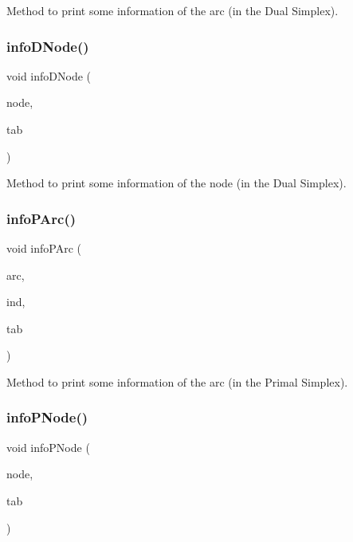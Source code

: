 Method to print some information of the arc (in the Dual Simplex). \mbox{\label{class_m_c_f_simplex_a38dc7bc8f5eba5cbbb1cbaac22c94eec}} 
\subsubsection{\texorpdfstring{info\+D\+Node()}{infoDNode()}}
{\footnotesize\ttfamily void info\+D\+Node (\begin{DoxyParamCaption}\item[{\mbox{\hyperlink{struct_m_c_f_simplex_1_1node_d_type}{node\+D\+Type}} $\ast$}]{node,  }\item[{int}]{tab }\end{DoxyParamCaption})\hspace{0.3cm}{\ttfamily [private]}}

Method to print some information of the node (in the Dual Simplex). \mbox{\label{class_m_c_f_simplex_ad361e52be6859383c382c92b9c466114}} 
\subsubsection{\texorpdfstring{info\+P\+Arc()}{infoPArc()}}
{\footnotesize\ttfamily void info\+P\+Arc (\begin{DoxyParamCaption}\item[{\mbox{\hyperlink{struct_m_c_f_simplex_1_1arc_p_type}{arc\+P\+Type}} $\ast$}]{arc,  }\item[{int}]{ind,  }\item[{int}]{tab }\end{DoxyParamCaption})\hspace{0.3cm}{\ttfamily [private]}}

Method to print some information of the arc (in the Primal Simplex). \mbox{\label{class_m_c_f_simplex_addd6da25d7293e26c4dd504dff1f6f49}} 
\subsubsection{\texorpdfstring{info\+P\+Node()}{infoPNode()}}
{\footnotesize\ttfamily void info\+P\+Node (\begin{DoxyParamCaption}\item[{\mbox{\hyperlink{struct_m_c_f_simplex_1_1node_p_type}{node\+P\+Type}} $\ast$}]{node,  }\item[{int}]{tab }\end{DoxyParamCaption})\hspace{0.3cm}{\ttfamily [private]}}

